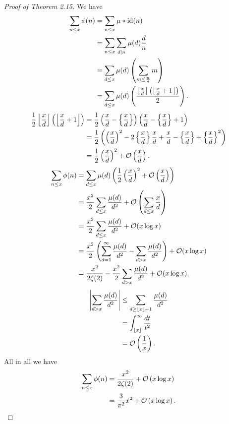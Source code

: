 \documentclass[twoside, openright, fontsize=10pt, headings=big]{scrbook}
\begin{document}
\begin{proof}[Proof of Theorem 2.15]
    We have
    \begin{align*}
        \sum_{n\leq x}\phi(n)&=\sum_{n\leq x}\mu\ast\mathrm{id}(n)\\
        &=\sum_{n\leq x}\sum_{d\mid n}\mu(d)\frac{d}{n}\\
        &=\sum_{d\leq x}\mu(d)\left(\sum_{m\leq\frac{n}{d}}m\right)\\
        &=\sum_{d\leq x}\mu(d)\left(\frac{\left\lfloor \frac{x}{d} \right\rfloor\left(\left\lfloor \frac{x}{d}+1 \right\rfloor\right)}{2}\right).
    \end{align*}
    \begin{align*}
        \frac{1}{2}\left\lfloor \frac{x}{d} \right\rfloor\left(\left\lfloor \frac{x}{d}+1 \right\rfloor\right)&=\frac{1}{2}\left(\frac{x}{d}-\left\{ \frac{x}{d} \right\}\right)\left(\frac{x}{d}-\left\{ \frac{x}{d} \right\}+1\right)\\
        &=\frac{1}{2}\left(\left(\frac{x}{d}\right)^2-2\left\{ \frac{x}{d} \right\}\frac{x}{d}+\frac{x}{d}-\left\{ \frac{x}{d} \right\}+\left\{ \frac{x}{d} \right\}^2\right)\\
        &=\frac{1}{2}\left(\frac{x}{d}\right)^2+\mathcal{O}\left(\frac{x}{d}\right).
    \end{align*}
    \begin{align*}
        \sum_{n\leq x}\phi(n)&=\sum_{d\leq x}\mu(d)\left(\frac{1}{2}\left(\frac{x}{d}\right)^2+\mathcal{O}\left(\frac{x}{d}\right)\right)\\
        &=\frac{x^2}{2}\sum_{d\leq x}\frac{\mu(d)}{d^2}+\mathcal{O}\left(\sum_{d\leq x}\frac{x}{d}\right)\\
        &=\frac{x^2}{2}\sum_{d\leq x}\frac{\mu(d)}{d^2}+\mathcal{O}(x\log x)\\
        &=\frac{x^2}{2}\left(\sum_{d=1}^{\infty}\frac{\mu(d)}{d^2}-\sum_{d> x}\frac{\mu(d)}{d^2}\right)+\mathcal{O}(x\log x)\\
        &=\frac{x^2}{2\zeta(2)}-\frac{x^2}{2}\sum_{d> x}\frac{\mu(d)}{d^2}+\mathcal{O}(x\log x).
    \end{align*}
    \begin{align*}
        \left|\sum_{d>x}\frac{\mu(d)}{d^2}\right|&\leq\sum_{d\geq\left\lfloor x \right\rfloor+1}\frac{\mu(d)}{d^2}\\
        &=\int_{\left\lfloor x \right\rfloor}^{\infty}\frac{dt}{t^2}\\
        &=\mathcal{O}\left(\frac{1}{x}\right).
    \end{align*}
    All in all we have
    \begin{align*}
        \sum_{n\leq x}\phi(n)&=\frac{x^2}{2\zeta(2)}+\mathcal{O}\left(x\log x\right)\\
        &=\frac{3}{\pi^2}x^2+\mathcal{O}\left(x\log x\right).\qedhere
    \end{align*}
\end{proof}
\end{document}
